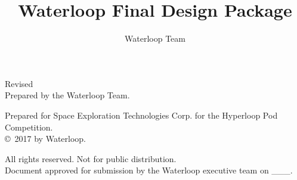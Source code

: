 \documentclass{report}
\author{Waterloop Team}
\title{Waterloop Final Design Package}
\date{\displaydate{date}}
\begin{document}
    \maketitle
    Revised \\
    
    Prepared by the Waterloop Team.
    
    Prepared for Space Exploration Technologies Corp. for the Hyperloop Pod Competition.\\
    
    \copyright \ 2017 by Waterloop.
    
    All rights reserved. Not for public distribution.\\
    
    Document approved for submission by the Waterloop executive team on \_\_\_.
    
    \tableofcontents
    \newpage
    
\end{document}
